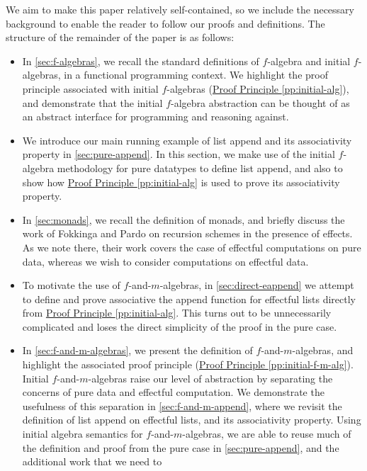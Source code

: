 \documentclass{jfp1}
\newcommand{\proofprinref}[1]{\hyperref[#1]{Proof Principle \ref*{#1}}}
\begin{document}
We aim to make this paper relatively self-contained, so we include the
necessary background to enable the reader to follow our proofs and
definitions. The structure of the remainder of the paper is as
follows:
\begin{itemize}
\item In \autoref{sec:f-algebras}, we recall the standard definitions
  of $f$-algebra and initial $f$-algebras, in a functional programming
  context. We highlight the proof principle associated with initial
  $f$-algebras (\proofprinref{pp:initial-alg}), and demonstrate that the
  initial $f$-algebra abstraction can be thought of as an abstract
  interface for programming and reasoning against.
\item We introduce our main running example of list append and its
  associativity property in \autoref{sec:pure-append}. In this
  section, we make use of the initial $f$-algebra methodology for pure
  datatypes to define list append, and also to show how
  \proofprinref{pp:initial-alg} is used to prove its associativity
  property.
\item In \autoref{sec:monads}, we recall the definition of monads, and
  briefly discuss the work of Fokkinga \cite{fokkinga94monadic} and
  Pardo \cite{pardo04combining} on recursion schemes in the presence
  of effects. As we note there, their work covers the case of
  effectful computations on pure data, whereas we wish to consider
  computations on effectful data.
\item To motivate the use of $f$-and-$m$-algebras, in
  \autoref{sec:direct-eappend} we attempt to define and prove
  associative the append function for effectful lists directly from
  \proofprinref{pp:initial-alg}. This turns out to be unnecessarily
  complicated and loses the direct simplicity of the proof in the pure
  case.
\item In \autoref{sec:f-and-m-algebras}, we present the definition of
  $f$-and-$m$-algebras, and highlight the associated proof principle
  (\proofprinref{pp:initial-f-m-alg}). Initial $f$-and-$m$-algebras
  raise our level of abstraction by separating the concerns of pure
  data and effectful computation. We demonstrate the usefulness of
  this separation in \autoref{sec:f-and-m-append}, where we revisit
  the definition of list append on effectful lists, and its
  associativity property. Using initial algebra semantics for
  $f$-and-$m$-algebras, we are able to reuse much of the
  definition and proof from the pure case in
  \autoref{sec:pure-append}, and the additional work that we need to

\end{itemize}
\end{document}

